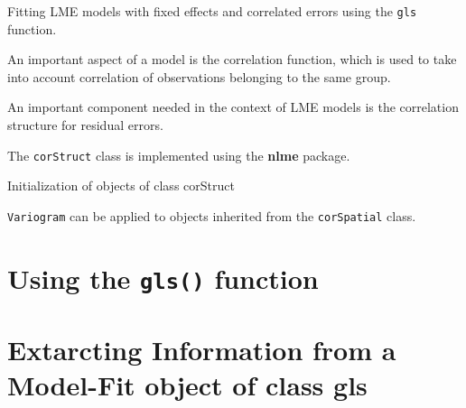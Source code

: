 Fitting LME models with fixed effects and correlated errors using the
\texttt{gls} function.

An important aspect of a model is the correlation function, which is used to
take into account correlation of observations belonging to the same group.



An important component needed in the context of LME models is the
correlation structure for residual errors.

The \texttt{corStruct} class is implemented using the \textbf{nlme} package.


Initialization of objects of class corStruct



\texttt{Variogram} can be applied to objects inherited from the
\texttt{corSpatial} class.



\section{Using the \texttt{gls()} function}  %


\section{Extarcting Information from a Model-Fit object of class gls}  %
